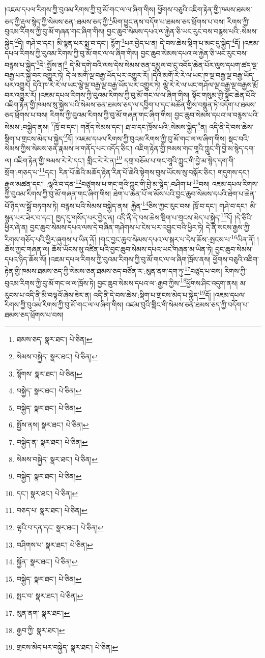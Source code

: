 །འཇམ་དཔལ་རིགས་ཀྱི་བུའམ་རིགས་ཀྱི་བུ་མོ་གང་ལ་ལ་ཞིག་གིས། ཕྱོགས་བཅུའི་འཇིག་རྟེན་གྱི་ཁམས་ཐམས་ཅད་ཀྱི་རྡུལ་སྙེད་ཀྱི་སེམས་ཅན་:ཐམས་ཅད་ཀྱི་\footnote{ཐམས་ཅད་  སྣར་ཐང་།  པེ་ཅིན། }མིག་ཕྱུང་ནས་བདོག་པ་ཐམས་ཅད་ཕྲོགས་པ་བས། རིགས་ཀྱི་བུའམ་རིགས་ཀྱི་བུ་མོ་གཞན་གང་ཞིག་གིས། བྱང་ཆུབ་སེམས་དཔའ་ལ་རྐྱེན་ཅི་ཡང་རུང་བས་བརྙས་པའི་:སེམས་སྐྱེད་\footnote{སེམས་བསྐྱེད་  སྣར་ཐང་།  པེ་ཅིན། }དེ། གཤེ་བ་དང་། མི་སྙན་པར་སྨྲ་བ་དང་། རྙོག་\footnote{སྙོགས་  སྣར་ཐང་།  པེ་ཅིན། }པར་བྱེད་པ་ན། དེ་བས་ཆེས་སྡིག་པ་མང་དུ་སྐྱེད་\footnote{བསྐྱེད་  སྣར་ཐང་།  པེ་ཅིན། }དོ། །འཇམ་དཔལ་རིགས་ཀྱི་བུའམ་རིགས་ཀྱི་བུ་མོ་གང་ལ་ལ་ཞིག་གིས། བྱང་ཆུབ་སེམས་དཔའ་ལ་རྐྱེན་ཅི་ཡང་རུང་བས་བརྙས་པ་སྐྱེད་\footnote{བསྐྱེད་  སྣར་ཐང་།  པེ་ཅིན། }དེ་:སྤྱོས་ན།\footnote{སྤྱོས་ནས།  སྣར་ཐང་།  པེ་ཅིན། } དེ་མི་དགེ་བའི་ལས་དེས་སེམས་ཅན་དམྱལ་བ་ངུ་འབོད་ཆེན་པོར་ལུས་དཔག་ཚད་ལྔ་བརྒྱ་པར་སྐྱེ་བར་འགྱུར་ཏེ། དེ་ལ་མགོ་ལྔ་བརྒྱ་ཡོད་པར་འགྱུར་རོ། །དེའི་མགོ་རེ་རེ་ལ་ཡང་ཁ་ལྔ་བརྒྱ་ལྔ་བརྒྱ་ཡོད་པར་འགྱུར། དེའི་ཁ་རེ་རེ་ལ་ཡང་ལྕེ་ལྔ་བརྒྱ་ལྔ་བརྒྱ་ཡོད་པར་འགྱུར་ཏེ། ལྕེ་རེ་རེ་ལ་ཡང་གཤོལ་ལྔ་བརྒྱ་ལྔ་བརྒྱས་རྨོ་བར་འགྱུར་རོ། །འཇམ་དཔལ་རིགས་ཀྱི་བུའམ་རིགས་ཀྱི་བུ་མོ་གང་ལ་ལ་ཞིག་གིས། སྟོང་གསུམ་གྱི་སྟོང་ཆེན་པོའི་འཇིག་རྟེན་གྱི་ཁམས་སུ་སྐྱེས་པའི་སེམས་ཅན་ཐམས་ཅད་ལ་དབྱིག་པ་དང་མཚོན་གྱིས་བསྣུན་ཏེ་བདོག་པ་ཐམས་ཅད་ཕྲོགས་པ་བས། རིགས་ཀྱི་བུའམ་རིགས་ཀྱི་བུ་མོ་གཞན་གང་ཞིག་གིས། བྱང་ཆུབ་སེམས་དཔའ་ལ་བརྙས་པའི་སེམས་:བསྐྱེད་ནས། \footnote{བསྐྱེད་ན་  སྣར་ཐང་།  པེ་ཅིན། }ཁྲོ་བ་དང་། གནོད་སེམས་དང་། ཐ་བ་དང་ཁྲོས་པའི་:སེམས་སྐྱེད་\footnote{སེམས་བསྐྱེད་  སྣར་ཐང་།  པེ་ཅིན། }ན། འདི་ནི་དེ་བས་ཆེས་སྡིག་པ་གྲངས་མེད་པ་སྐྱེད་\footnote{བསྐྱེད་  སྣར་ཐང་།  པེ་ཅིན། }དོ། །འཇམ་དཔལ་རིགས་ཀྱི་བུའམ་རིགས་ཀྱི་བུ་མོ་གང་ལ་ལ་ཞིག་གིས། སྡང་བའི་སེམས་ཀྱིས་སེམས་ཅན་རྣམས་ལ་གནོད་པར་འདོད་ཅིང་། འཇིག་རྟེན་གྱི་ཁམས་གང་གཱའི་ཀླུང་གི་བྱེ་མ་སྙེད་དག་ལ། འཇིག་རྟེན་གྱི་ཁམས་རེ་རེ་དང་། གླིང་རེ་རེ་ན།\footnote{དང་།  སྣར་ཐང་།  པེ་ཅིན། } དགྲ་བཅོམ་པ་གང་གཱའི་ཀླུང་གི་བྱེ་མ་སྙེད་དག་གི་སྲོག་:གཅད་པ་\footnote{བཅད་པ་  སྣར་ཐང་།  པེ་ཅིན། }དང་། རིན་པོ་ཆེའི་མཆོད་རྟེན་རིན་པོ་ཆེའི་སྟེགས་བུས་ཡོངས་སུ་བསྐོར་ཅིང་། གདུགས་དང་། རྒྱལ་མཚན་དང་། :ལྷའི་བ་དན་\footnote{ལྷའི་བ་དན་དང་  སྣར་ཐང་།  པེ་ཅིན། }བཙུགས་པ་གང་གཱའི་ཀླུང་གི་བྱེ་མ་སྙེད་:བཤིག་པ་\footnote{བཤིགས་པ་  སྣར་ཐང་།  པེ་ཅིན། }བས། འཇམ་དཔལ་རིགས་ཀྱི་བུའམ་རིགས་ཀྱི་བུ་མོ་གཞན་གང་ཞིག་གིས། ཐེག་པ་ཆེན་པོ་ལ་མོས་པའི་བྱང་ཆུབ་སེམས་དཔའི་ཐེག་པ་ཆེན་པོ་ཉིད་ལ་སྒྲོ་བཏགས་ཏེ། བརྙས་པའི་སེམས་བསྐྱེད་ནས། རྐྱེན་\footnote{སྐྱོན་  སྣར་ཐང་།  པེ་ཅིན། }ཅིས་ཀྱང་རུང་བས། ཁྲོ་བ་དང་། གཤེ་བ་དང་། མི་སྙན་པར་ཟེར་བ་དང་། ཁྱད་དུ་གསོད་པར་བྱེད་ན། འདི་ནི་དེ་བས་ཆེས་སྡིག་པ་གྲངས་མེད་པ་སྐྱེད་\footnote{བསྐྱེད་  སྣར་ཐང་།  པེ་ཅིན། }དོ། །དེ་ཅིའི་ཕྱིར་ཞེ་ན། བྱང་ཆུབ་སེམས་དཔའ་ལས་དེ་བཞིན་གཤེགས་པ་ངེས་པར་འབྱུང་བའི་ཕྱིར་ཏེ། དེ་ནི་སངས་རྒྱས་ཀྱི་རིགས་གཅོད་པའི་ཕྱིར་ཞུགས་པ་ཡིན་ནོ། །གང་བྱང་ཆུབ་སེམས་དཔའ་ལ་སྐུར་པ་དེས་ཆོས་:སྤངས་པ་\footnote{སྤང་བ་  སྣར་ཐང་།  པེ་ཅིན། }ཡིན་ནོ། །ཆོས་ཀྱང་གཞན་ལ། ཆོས་ཡོངས་སུ་འཛིན་པའི་བྱང་ཆུབ་སེམས་དཔའ་ཡང་གཞན་མ་ཡིན་ཏེ། བྱང་ཆུབ་སེམས་དཔའ་ཉིད་ཆོས་སོ། །འཇམ་དཔལ་རིགས་ཀྱི་བུའམ་རིགས་ཀྱི་བུ་མོ་གང་ལ་ལ་ཞིག་ཁྲོས་ནས། ཕྱོགས་བཅུའི་འཇིག་རྟེན་གྱི་ཁམས་ཐམས་ཅད་ཀྱི་སེམས་ཅན་ཐམས་ཅད་བཙོན་ར་:མུན་ནག་དག་ཏུ་\footnote{མུན་ནག་  སྣར་ཐང་། }བཙུད་པ་བས། རིགས་ཀྱི་བུའམ་རིགས་ཀྱི་བུ་མོ་གང་ལ་ལ་ཁྲོས་ཏེ། བྱང་ཆུབ་སེམས་དཔའ་ལ་:རྒྱབ་ཀྱིས་\footnote{རྒྱབ་ཀྱི་  སྣར་ཐང་། }ཕྱོགས་ཤིང་འདུག་ནས། མ་རུངས་པ་འདི་ནི་མི་བལྟའོ་ཞེས་ཟེར་ན། འདི་ནི་དེ་བས་ཆེས་:སྡིག་པ་གྲངས་མེད་པ་སྐྱེད་\footnote{གྲངས་མེད་པར་བསྐྱེད་  སྣར་ཐང་།  པེ་ཅིན། }དོ། །འཇམ་དཔལ་རིགས་ཀྱི་བུའམ་རིགས་ཀྱི་བུ་མོ་གང་ལ་ལ་ཞིག་གིས། འཛམ་བུའི་གླིང་གི་སེམས་ཅན་ཐམས་ཅད་ཀྱི་བདོག་པ་ཐམས་ཅད་ཕྲོགས་པ་བས། 
